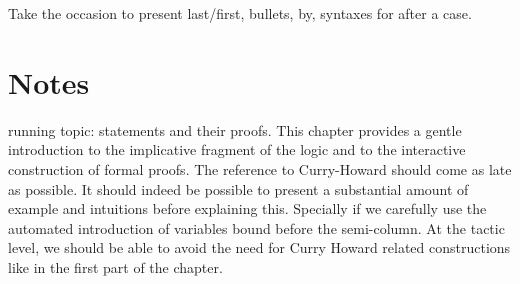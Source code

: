 Take the occasion to present last/first, bullets, by, syntaxes for
\C{=> [|IH x xs]} after a case.


\section{Notes}

%
%
%

running topic: statements and their proofs. This chapter provides a gentle
introduction to the implicative fragment of the logic and to the
interactive construction of formal proofs. The reference to
Curry-Howard should come as late as possible. It should indeed be
possible to present a substantial amount of example and intuitions
before explaining this. Specially if we carefully use the automated
introduction of variables bound before the semi-column. At the tactic
level, we should be able to avoid the need for Curry Howard related
constructions like  in the first part of the chapter.

